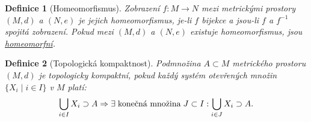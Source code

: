 \documentclass[11pt]{article}
\theoremstyle{nontheoremstyle}
\newtheorem*{definition}{Definice}
\theoremstyle{nontheoremstylenodot}
\theoremstyle{theoremstyle}
\begin{document}
\begin{definition}[Homeomorfismus]
    Zobrazení $f: M\to N$ mezi metrickými prostory $(M,d)$ a $(N,e)$ je jejich homeomorfismus, je-li $f$ bijekce a jsou-li $f$ a $f^{-1}$ spojitá zobrazení.
    Pokud mezi $(M,d)$ a $(N,e)$ existuje homeomorfismus, jsou \underline{homeomorfní}.
\end{definition}

\begin{definition}[Topologická kompaktnost]
    Podmnožina $A\subset M$ metrického prostoru $(M,d)$ je topologicky kompaktní, pokud každý systém otevřených množin $\{ X_i \mid i \in I \}$ v $M$ platí:
    \[ \bigcup_{i \in I} X_i \supset A \Rightarrow \exists \hspace{1mm} \text{konečná množina} \hspace{1mm} J \subset I: \bigcup_{i\in J}X_i \supset A. \]
\end{definition}
\end{document}
